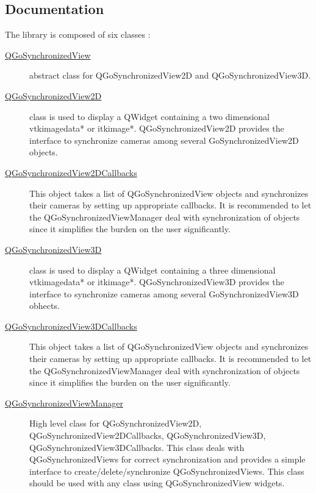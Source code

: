 \documentclass{InsightArticle}
\begin{document}
\subsection*{Documentation}
The library is composed of six classes :
\begin{description}
  \item [\href {http://gofigure2.sourceforge.net/Doxygen/Nightly/html/classQGoSynchronizedView.html}{QGoSynchronizedView}]
    abstract class for QGoSynchronizedView2D and QGoSynchronizedView3D.
    
  \item [\href {http://gofigure2.sourceforge.net/Doxygen/Nightly/html/classQGoSynchronizedView2D.html}{QGoSynchronizedView2D}]
    class is used to display a QWidget containing a two dimensional vtkimagedata* or itkimage*. QGoSynchronizedView2D provides the interface to synchronize cameras among several GoSynchronizedView2D objects.
    
  \item [\href {http://gofigure2.sourceforge.net/Doxygen/Nightly/html/classQGoSynchronizedView2DCallbacks.html}{QGoSynchronizedView2DCallbacks}]
    This object takes a list of QGoSynchronizedView objects and synchronizes their cameras by setting up appropriate callbacks. It is recommended to let the QGoSynchronizedViewManager deal with synchronization of objects since it simplifies the burden on the user significantly.
    
  \item [\href {http://gofigure2.sourceforge.net/Doxygen/Nightly/html/classQGoSynchronizedView3D.html}{QGoSynchronizedView3D}]class is used to display a QWidget containing a three dimensional vtkimagedata* or itkimage*. QGoSynchronizedView3D provides the interface to synchronize cameras among several GoSynchronizedView3D obhects.
  
  \item [\href {http://gofigure2.sourceforge.net/Doxygen/Nightly/html/classQGoSynchronizedView3DCallbacks.html}{QGoSynchronizedView3DCallbacks}]
    This object takes a list of QGoSynchronizedView objects and synchronizes their cameras by setting up appropriate callbacks. It is recommended to let the QGoSynchronizedViewManager deal with synchronization of objects since it simplifies the burden on the user significantly.
  
  \item [\href {http://gofigure2.sourceforge.net/Doxygen/Nightly/html/classQGoSynchronizedViewManager.html}{QGoSynchronizedViewManager}]
  High level class for QGoSynchronizedView2D, QGoSynchronizedView2DCallbacks, QGoSynchronizedView3D, QGoSynchronizedView3DCallbacks. This class deals with QGoSynchronizedViews for correct synchronization and provides a simple interface to create/delete/synchronize QGoSynchronizedViews. This class should be used with any class using QGoSynchronizedView widgets.
  
\end{description}
\end{document}

